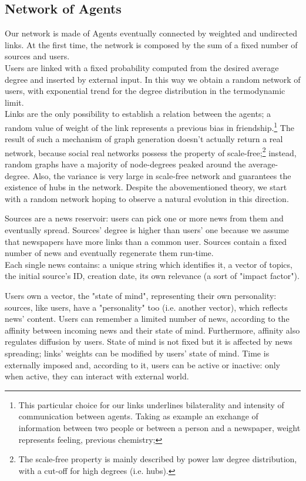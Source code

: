 \subsection{Network of Agents}\label{subsec:network}
Our network is made of Agents eventually connected by weighted and undirected links.
At the first time, the network is composed by the sum of a fixed number of sources and users. \\
Users are linked with a fixed probability computed from the desired average degree and inserted by external input.
 In this way we obtain a random network of users, with exponential trend for the degree distribution in the termodynamic limit.
\\ Links are the only possibility to establish a relation between the agents; a random value of weight of the link represents a previous bias in 
friendship.\footnote{This particular choice for our links underlines bilaterality and intensity of communication between agents.
Taking as example an exchange of information between two people or between a person and a newspaper, weight represents feeling, previous chemistry;}
The result of such a mechanism of graph generation doesn't actually return a real network, because social real networks possess the property of 
scale-free;\footnote{The scale-free property is mainly described by power law degree distribution, with a cut-off for high degrees (i.e. hubs). } instead, random graphs have a majority of node-degrees peaked around the average-degree. 
Also, the variance is very large in scale-free network and guarantees the existence of hubs in the network.\cite{newman1963introduction}
Despite the abovementioned theory, we start with a random network hoping to observe a natural evolution in this direction.

Sources are a news reservoir: users can pick one or more news from them and eventually spread.
Sources' degree is higher than users' one because we assume that newspapers have more links than a common user.
Sources contain a fixed number of news and eventually regenerate them run-time. \\
Each single news contains: a unique string which identifies it, a vector of topics, the initial source's ID, creation date, its own relevance (a sort of "impact factor").

Users own a vector, the "state of mind", representing their own personality: sources, like users, have a "personality" too (i.e. another vector), which reflects news' content.
Users can remember a limited number of news, according to the affinity between incoming news and their state of mind.
Furthermore, affinity also regulates diffusion by users.
State of mind is not fixed but it is affected by news spreading; links' weights can be modified by users' state of mind.
Time is externally imposed and, according to it, users can be active or inactive: only when active, they can interact with external world.

